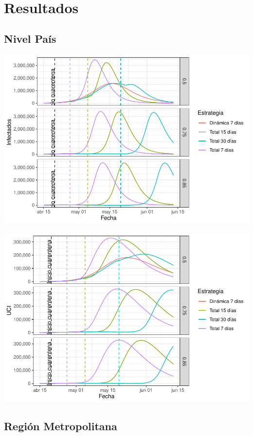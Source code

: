 \documentclass[]{article}
\begin{document}
\hypertarget{resultados}{%
\section{Resultados}\label{resultados}}

\hypertarget{nivel-pauxeds}{%
\subsection{Nivel País}\label{nivel-pauxeds}}

\includegraphics{Informe_Mesa_2020_04_16_files/figure-latex/unnamed-chunk-3-1.pdf}

\includegraphics{Informe_Mesa_2020_04_16_files/figure-latex/unnamed-chunk-4-1.pdf}

\hypertarget{regiuxf3n-metropolitana}{%
\subsection{Región Metropolitana}\label{regiuxf3n-metropolitana}}
\end{document}
